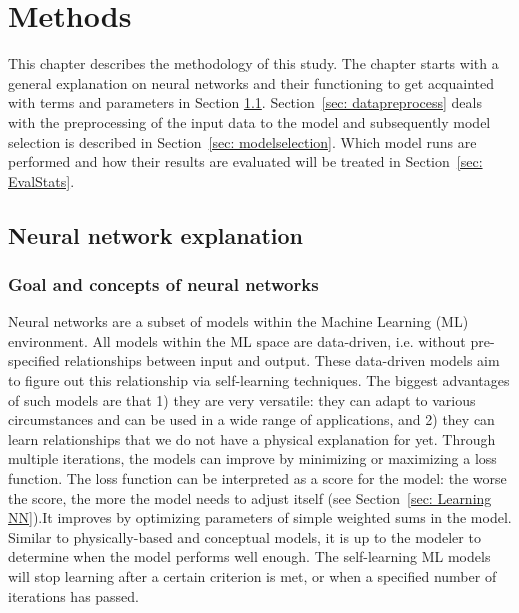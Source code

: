 \documentclass[twocolumn, 10pt, a4paper]{memoir}
\begin{document}
	
	
	\chapter{Methods} \label{ch: methods}
	This chapter describes the methodology of this study. The chapter starts with a general explanation on neural networks and their functioning to get acquainted with terms and parameters in Section \ref{sec: NN explain}. Section~\ref{sec: datapreprocess} deals with the preprocessing of the input data to the model and subsequently model selection is described in Section~\ref{sec: modelselection}. Which model runs are performed and how their results are evaluated will be treated in Section~\ref{sec: EvalStats}.
	\section{Neural network explanation} \label{sec: NN explain}
	\subsection{Goal and concepts of neural networks} \label{sec: NNConcepts}
	Neural networks are a subset of models within the Machine Learning (ML) environment. All models within the ML space are data-driven, i.e. without pre-specified relationships between input and output. These data-driven models aim to figure out this relationship via self-learning techniques.
	The biggest advantages of such models are that 1) they are very versatile: they can adapt to various circumstances and can be used in a wide range of applications, and 2) they can learn relationships that we do not have a physical explanation for yet. Through multiple iterations, the models can improve by minimizing or maximizing a loss function. The loss function can be interpreted as a score for the model: the worse the score, the more the model needs to adjust itself (see Section~\ref{sec: Learning NN}).It improves by optimizing parameters of simple weighted sums in the model. Similar to physically-based and conceptual models, it is up to the modeler to determine when the model performs well enough. The self-learning ML models will stop learning after a certain criterion is met, or when a specified number of iterations has passed.
	
\end{document}
